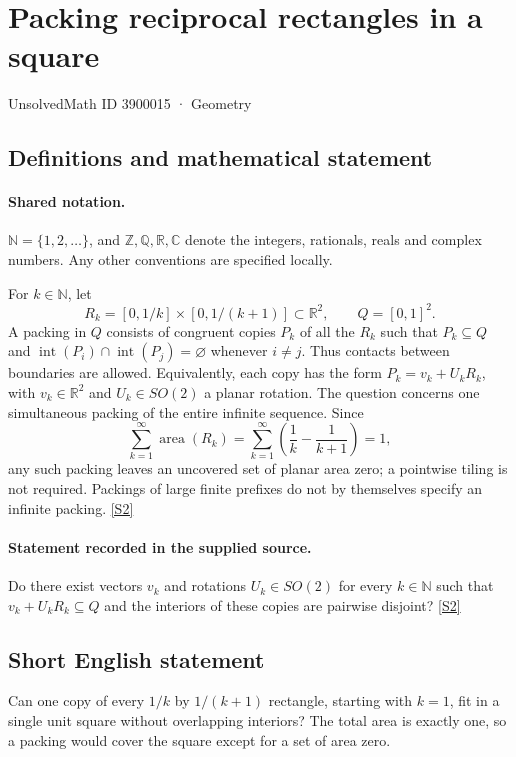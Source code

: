 \documentclass[11pt]{book}
\newcommand{\sref}[2]{\hyperlink{source:#1:#2}{[S#2]}}
\begin{document}
\setcounter{section}{3900014}
\section{Packing reciprocal rectangles in a square}\label{3900015}
{\small\sffamily UnsolvedMath ID 3900015 · Geometry}
\subsection{Definitions and mathematical statement}

\paragraph{Shared notation.}$\mathbb N=\{1,2,\ldots\}$, and $\mathbb Z,\mathbb Q,\mathbb R,\mathbb C$ denote the integers, rationals, reals and complex numbers. Any other conventions are specified locally.


For $k\in\mathbb N$, let
\[
 R_k=[0,1/k]\times[0,1/(k+1)]\subset\mathbb R^2,
 \qquad Q=[0,1]^2.
\]
A packing in $Q$ consists of congruent copies $P_k$ of all the $R_k$ such that $P_k\subseteq Q$ and $\operatorname{int}(P_i)\cap\operatorname{int}(P_j)=\varnothing$ whenever $i\ne j$. Thus contacts between boundaries are allowed. Equivalently, each copy has the form $P_k=v_k+U_kR_k$, with $v_k\in\mathbb R^2$ and $U_k\in SO(2)$ a planar rotation. The question concerns one simultaneous packing of the entire infinite sequence.
Since
\[
 \sum_{k=1}^{\infty}\operatorname{area}(R_k)
 =\sum_{k=1}^{\infty}\left(\frac1k-\frac1{k+1}\right)=1,
\]
any such packing leaves an uncovered set of planar area zero; a pointwise tiling is not required. Packings of large finite prefixes do not by themselves specify an infinite packing. \sref{3900015}{2}
\paragraph{Statement recorded in the supplied source.}
Do there exist vectors $v_k$ and rotations $U_k\in SO(2)$ for every $k\in\mathbb N$ such that $v_k+U_kR_k\subseteq Q$ and the interiors of these copies are pairwise disjoint? \sref{3900015}{2}
\subsection{Short English statement}
Can one copy of every $1/k$ by $1/(k+1)$ rectangle, starting with $k=1$, fit in a single unit square without overlapping interiors? The total area is exactly one, so a packing would cover the square except for a set of area zero.
\end{document}
